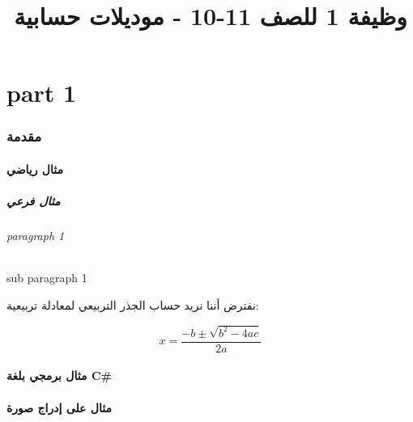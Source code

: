 \documentclass[12pt]{article}
\title{وظيفة 1 للصف 11-10 - موديلات حسابية}
\newif\ifwithcode
\begin{document}
\maketitle


\part*{part 1} %
\section*{مقدمة}
\subsection*{مثال رياضي}
\subsubsection*{مثال فرعي}
\paragraph*{ paragraph 1}
\subparagraph*{sub paragraph 1}

نفترض أننا نريد حساب الجذر التربيعي لمعادلة تربيعية:

\begin{equation}
x = \frac{-b \pm \sqrt{b^2 - 4ac}}{2a}
\end{equation}

\subsection*{مثال برمجي بلغة C\#}

\ifwithcode
\begin{english}
\begin{lstlisting}
// C# Example
using System;

class Program {
    static void Main() {
        Console.WriteLine("Hello, world!");
    }
}
\end{lstlisting}
\end{english}
\fi

\subsection*{مثال على إدراج صورة}

\begin{center}
\end{center}
\end{document}
